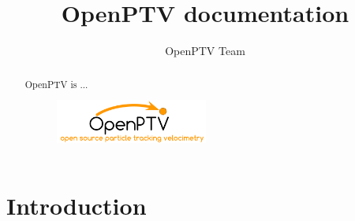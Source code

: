 \documentclass{report}
\begin{document}
\author{OpenPTV Team}
\title{OpenPTV documentation}
\pagestyle{empty}
\maketitle
\thispagestyle{empty}

\pagestyle{fancy}

\begin{abstract}
OpenPTV is ...

\begin{figure}[!ht]
\includegraphics[width=5cm]{./img/OpenPTV_logo.png}
\end{figure}
\end{abstract}

\tableofcontents
\listoffigures
\newpage

\chapter{Introduction}





\appendix

\end{document}
